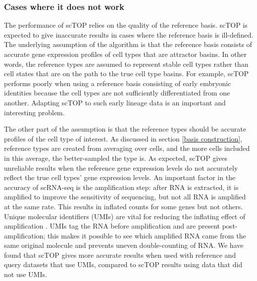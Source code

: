 \documentclass[aps,superscriptaddress, notitlepage,longbibliography]{revtex4-1}
\begin{document}
\subsubsection{Cases where it does not work}\label{failure_cases}
The performance of scTOP relies on the quality of the reference basis. scTOP is expected to give inaccurate results in cases where the reference basis is ill-defined. The underlying assumption of the algorithm is that the reference basis consists of accurate gene expression profiles of cell types that are attractor basins. In other words, the reference types are assumed to represent stable cell types rather than cell states that are on the path to the true cell type basins. For example, scTOP performs poorly when using a reference basis consisting of early embryonic identities because the cell types are not sufficiently differentiated from one another. Adapting scTOP to such early lineage data is an important and interesting problem.

The other part of the assumption is that the reference types should be accurate profiles of the cell type of interest. As discussed in section \ref{basis construction}, reference types are created from averaging over cells, and the more cells included in this average, the better-sampled the type is. As expected, scTOP gives unreliable results when the reference gene expression levels do not accurately reflect the true cell types' gene expression levels. An important factor in the accuracy of scRNA-seq is the amplification step: after RNA is extracted, it is amplified to improve the sensitivity of sequencing, but not all RNA is amplified at the same rate. This results in inflated counts for some genes but not others. Unique molecular identifiers (UMIs) are vital for reducing the inflating effect of amplification \cite{islam2014quantitative}. UMIs tag the RNA before amplification and are present post-amplification; this makes it possible to see which amplified RNA came from the same original molecule and prevents uneven double-counting of RNA. We have found that scTOP gives more accurate results when used with reference and query datasets that use UMIs, compared to scTOP results using data that did not use UMIs.
\end{document}
